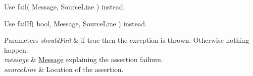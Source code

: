 
\begin{DoxyRefList}
\item[\label{deprecated__deprecated000001}%
\hypertarget{deprecated__deprecated000001}{}%
Member \hyperlink{ai_post_process_8h_acd2361a766665ce2dbfb3eae201b784d}{ai\-Process\-\_\-\-Convert\-To\-Left\-Handed} ]
\item[\label{deprecated__deprecated000002}%
\hypertarget{deprecated__deprecated000002}{}%
Member \hyperlink{struct_asserter_a74825fc71909baa1286f9282ba5a2a54}{Asserter\-:\-:fail} (std\-::string message, const \hyperlink{class_source_line}{Source\-Line} \&source\-Line=\hyperlink{class_source_line}{Source\-Line()})]Use fail( Message, Source\-Line ) instead.  
\item[\label{deprecated__deprecated000003}%
\hypertarget{deprecated__deprecated000003}{}%
Member \hyperlink{struct_asserter_a71a4667a9d3f5d483f1a82157f715824}{Asserter\-:\-:fail\-If} (bool should\-Fail, std\-::string message, const \hyperlink{class_source_line}{Source\-Line} \&source\-Line=\hyperlink{class_source_line}{Source\-Line()})]Use fail\-If( bool, Message, Source\-Line ) instead. 
\begin{DoxyParams}{Parameters}
{\em should\-Fail} & if {\ttfamily true} then the exception is thrown. Otherwise nothing happen. \\
\hline
{\em message} & \hyperlink{class_message}{Message} explaining the assertion failiure. \\
\hline
{\em source\-Line} & Location of the assertion.  \\
\hline
\end{DoxyParams}


\end{DoxyRefList}
